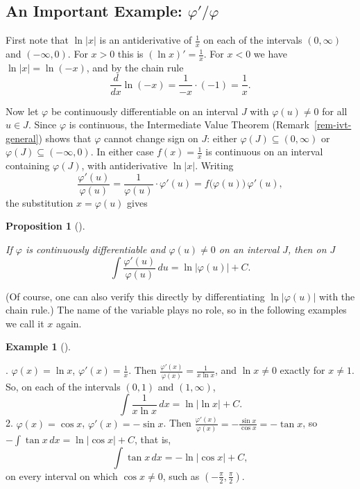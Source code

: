 \documentclass[
  letterpaper,
  DIV=11,
  numbers=noendperiod]{scrreprt}
\theoremstyle{plain}
\theoremstyle{plain}
\newtheorem{proposition}{Proposition}[chapter]
\theoremstyle{definition}
\theoremstyle{definition}
\theoremstyle{definition}
\newtheorem{example}{Example}[chapter]
\theoremstyle{plain}
\theoremstyle{plain}
\theoremstyle{remark}
\begin{document}
\subsection{\texorpdfstring{An Important Example:
\(\varphi'/\varphi\)}{An Important Example: \textbackslash varphi\textquotesingle/\textbackslash varphi}}\label{an-important-example-varphivarphi}

First note that \(\ln\lvert x \rvert\) is an antiderivative of
\(\frac1x\) on each of the intervals \((0,\infty)\) and \((-\infty,0)\).
For \(x>0\) this is \((\ln x)'=\frac1x\). For \(x<0\) we have
\(\ln\lvert x \rvert = \ln(-x)\), and by the chain rule \[
\frac{d}{dx}\ln(-x) = \frac{1}{-x}\cdot(-1) = \frac1x .
\]

Now let \(\varphi\) be continuously differentiable on an interval \(J\)
with \(\varphi(u)\neq0\) for all \(u\in J\). Since \(\varphi\) is
continuous, the Intermediate Value Theorem
(Remark~\ref{rem-ivt-general}) shows that \(\varphi\) cannot change sign
on \(J\): either \(\varphi(J)\subseteq(0,\infty)\) or
\(\varphi(J)\subseteq(-\infty,0)\). In either case \(f(x)=\frac1x\) is
continuous on an interval containing \(\varphi(J)\), with antiderivative
\(\ln\lvert x \rvert\). Writing \[
\frac{\varphi'(u)}{\varphi(u)} = \frac{1}{\varphi(u)}\cdot\varphi'(u) = f\big(\varphi(u)\big)\,\varphi'(u),
\] the substitution \(x=\varphi(u)\) gives

\begin{proposition}[]\protect\hypertarget{prp-log-derivative}{}\label{prp-log-derivative}

\hfill\break
If \(\varphi\) is continuously differentiable and \(\varphi(u)\neq0\) on
an interval \(J\), then on \(J\) \[
\int\frac{\varphi'(u)}{\varphi(u)}\,du = \ln\lvert \varphi(u) \rvert + C .
\]

\end{proposition}

(Of course, one can also verify this directly by differentiating
\(\ln\lvert \varphi(u) \rvert\) with the chain rule.) The name of the
variable plays no role, so in the following examples we call it \(x\)
again.

\begin{example}[]\protect\hypertarget{exm-log-derivative}{}\label{exm-log-derivative}

\hfill{}. \(\varphi(x) = \ln x\), \(\varphi'(x) = \frac1x\). Then
\(\frac{\varphi'(x)}{\varphi(x)} = \frac{1}{x\ln x}\), and
\(\ln x\neq0\) exactly for \(x\neq1\). So, on each of the intervals
\((0,1)\) and \((1,\infty)\), \[
   \int\frac{1}{x\ln x}\,dx = \ln\lvert \ln x \rvert+C .
   \] 2. \(\varphi(x) = \cos x\), \(\varphi'(x) = -\sin x\). Then
\(\frac{\varphi'(x)}{\varphi(x)} = -\frac{\sin x}{\cos x} = -\tan x\),
so \(-\int\tan x\,dx = \ln\lvert \cos x \rvert+C\), that is, \[
   \int\tan x\,dx = -\ln\lvert \cos x \rvert+C ,
   \] on every interval on which \(\cos x\neq0\), such as
\(\left(-\frac\pi2,\frac\pi2\right)\).

\end{example}
\end{document}
